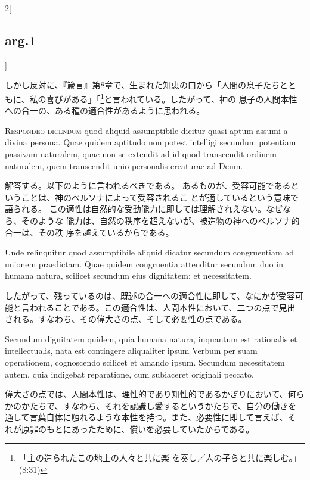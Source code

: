 \documentclass[paper=a4paper,fontsize=10pt,jafontsize=9pt,titlepage]{jlreq}
\begin{document}
\begin{paracol}{2}[\subsection{arg.1}]
\switchcolumn

しかし反対に、『箴言』第8章で、生まれた知恵の口から「人間の息子たちとと
 もに、私の喜びがある」「\footnote{「主の造られたこの地上の人々と共に楽
 を奏し／人の子らと共に楽しむ。」(8:31)}と言われている。したがって、神の
 息子の人間本性への合一の、ある種の適合性があるように思われる。


{\scshape Respondeo dicendum} quod aliquid assumptibile dicitur quasi aptum assumi
a divina persona. Quae quidem aptitudo non potest intelligi secundum
potentiam passivam naturalem, quae non se extendit ad id quod
transcendit ordinem naturalem, quem transcendit unio personalis
creaturae ad Deum.

\switchcolumn

解答する。以下のように言われるべきである。
あるものが、受容可能であるということは、神のペルソナによって受容されるこ
 とが適しているという意味で語られる。
この適性は自然的な受動能力に即しては理解されえない。なぜなら、そのような
 能力は、自然の秩序を超えないが、被造物の神へのペルソナ的合一は、その秩
 序を越えているからである。

\switchcolumn*

Unde relinquitur quod assumptibile aliquid dicatur
secundum congruentiam ad unionem praedictam. Quae quidem congruentia
attenditur secundum duo in humana natura, scilicet secundum eius
dignitatem; et necessitatem.

\switchcolumn

したがって、残っているのは、既述の合一への適合性に即して、なにかが受容可
 能と言われることである。この適合性は、人間本性において、二つの点で見出
 される。すなわち、その偉大さの点、そして必要性の点である。

\switchcolumn*

Secundum dignitatem quidem, quia humana
natura, inquantum est rationalis et intellectualis, nata est contingere
aliqualiter ipsum Verbum per suam operationem, cognoscendo scilicet et
amando ipsum. Secundum necessitatem autem, quia indigebat reparatione,
cum subiaceret originali peccato.

\switchcolumn

偉大さの点では、人間本性は、理性的であり知性的であるかぎりにおいて、何ら
 かのかたちで、すなわち、それを認識し愛するというかたちで、自分の働きを
 通して言葉自体に触れるような本性を持つ。また、必要性に即して言えば、そ
 れが原罪のもとにあったために、償いを必要していたからである。


\end{paracol}
\end{document}
